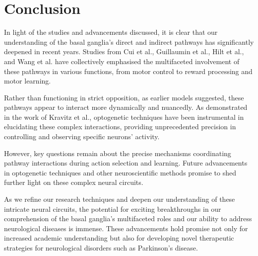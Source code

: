 \documentclass[10pt]{article}
\begin{document}
\begin{sloppypar}
  \section{Conclusion}
  \label{sec:conclusion}

  In light of the studies and advancements discussed, it is clear that our understanding of the basal ganglia’s direct and indirect pathways has significantly deepened in recent years. Studies from Cui et al., Guillaumin et al., Hilt et al., and Wang et al. have collectively emphasised the multifaceted involvement of these pathways in various functions, from motor control to reward processing and motor learning.

  Rather than functioning in strict opposition, as earlier models suggested, these pathways appear to interact more dynamically and nuancedly. As demonstrated in the work of Kravitz et al., optogenetic techniques have been instrumental in elucidating these complex interactions, providing unprecedented precision in controlling and observing specific neurons’ activity.

  However, key questions remain about the precise mechanisms coordinating pathway interactions during action selection and learning. Future advancements in optogenetic techniques and other neuroscientific methods promise to shed further light on these complex neural circuits.

  As we refine our research techniques and deepen our understanding of these intricate neural circuits, the potential for exciting breakthroughs in our comprehension of the basal ganglia’s multifaceted roles and our ability to address neurological diseases is immense. These advancements hold promise not only for increased academic understanding but also for developing novel therapeutic strategies for neurological disorders such as Parkinson’s disease.

  \pagebreak
  \singlespacing %
  
  

\end{sloppypar}
\end{document}
